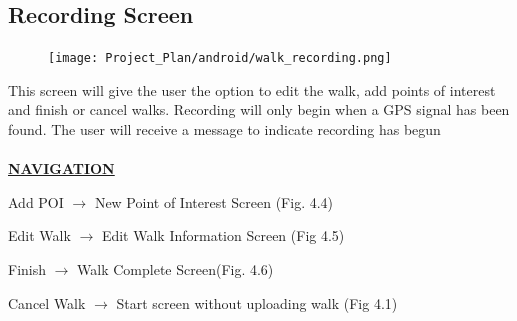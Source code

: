 \documentclass[12pt]{article}
\begin{document}
\subsection{Recording Screen}
\begin{figure}[htp]
\centering
\texttt{[image: Project\_Plan/android/walk\_recording.png]}
\caption{}
\label{}
\end{figure}
\par{This screen will give the user the option to edit the walk, add points of interest and finish or cancel walks. Recording will only begin when a GPS signal has been found. The user will receive a message to indicate recording has begun\\ \\}
\textbf{\uline{NAVIGATION}}
\par{Add POI $\rightarrow$ New Point of Interest Screen (Fig. 4.4)}
\par{Edit Walk $\rightarrow$ Edit Walk Information Screen (Fig 4.5)}
\par{Finish $\rightarrow$ Walk Complete Screen(Fig. 4.6)}
\par{Cancel Walk $\rightarrow$ Start screen without uploading walk (Fig 4.1)}
\newpage
\end{document}
